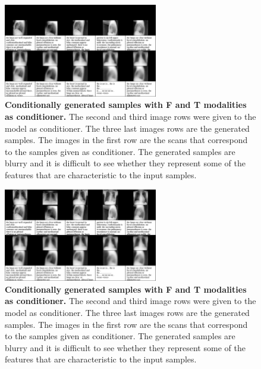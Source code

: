         \begin{frame}
            \begin{figure}
            \centering
            \includegraphics[width=0.6\textwidth, height = \textheight, keepaspectratio]{data/cond_gen/Lateral_text_censored}
                \caption{\tiny{
        \textbf{Conditionally generated samples with F and T modalities as conditioner.} The second and third image rows were given to the model as conditioner. The three last images rows are the generated samples. The images in the first row are the scans that correspond to the samples given as conditioner. The generated samples are blurry and it is difficult to see whether they represent some of the features that are characteristic to the input samples.
    }}
    \end{figure}
    \pause
    \begin{figure}
            \centering
            \includegraphics[width=0.6\textwidth, height = \textheight, keepaspectratio]{data/cond_gen/Lateral_text}
                \caption{\tiny{
        \textbf{Conditionally generated samples with F and T modalities as conditioner.} The second and third image rows were given to the model as conditioner. The three last images rows are the generated samples. The images in the first row are the scans that correspond to the samples given as conditioner. The generated samples are blurry and it is difficult to see whether they represent some of the features that are characteristic to the input samples.
    }}
        \end{figure}
    \end{frame}

